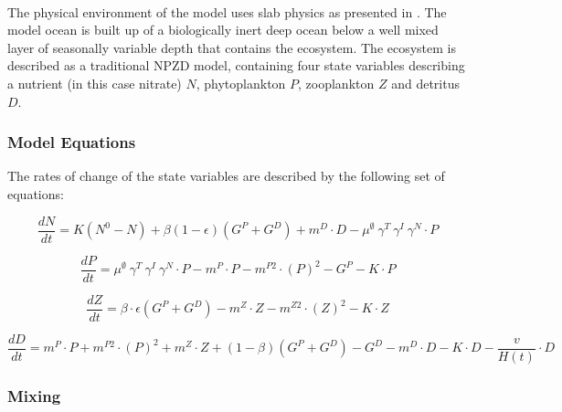\documentclass[template.tex]{subfiles}
\begin{document}
\\ 
The physical environment of the model uses slab physics as presented in \citet{Evans1985ACycles}. The model ocean is built up of a biologically inert deep ocean below a well mixed layer of seasonally variable depth that contains the ecosystem. The ecosystem is described as a traditional NPZD model, containing four state variables describing a nutrient (in this case nitrate) $N$, phytoplankton $P$, zooplankton $Z$ and detritus $D$. 

\subsubsection{Model Equations}
The rates of change of the state variables are described by the following set of equations:

\begin{equation}
    \frac{d N}{d t} = 
    K (N^0 - N) %
    + \beta(1 - \epsilon)(G^P + G^D) %
    + m^D \cdot D %
    - \mu^{\emptyset} \ \gamma^{T} \ \gamma^{I} \ \gamma^{N} \cdot P %
\end{equation}

\begin{equation}
    \frac{d P}{d t} =
    \mu^{\emptyset} \ \gamma^{T} \ \gamma^{I} \ \gamma^{N} \cdot P  %
    - m^P \cdot P %
    - m^{P2} \cdot (P)^2 %
    - G^P %
    - K \cdot P %
\end{equation}

\begin{equation}
    \frac{d Z}{d t} =
    \beta \cdot \epsilon(G^P + G^D) %
    - m^Z \cdot Z %
    - m^{Z2} \cdot (Z)^2 %
    - K \cdot Z %
\end{equation}

\begin{equation}
    \frac{d D}{d t} = 
    m^P \cdot P %
    + m^{P2} \cdot (P)^2 %
    + m^Z \cdot Z %
    + (1 - \beta)(G^P + G^D) %
    - G^D %
    - m^D \cdot D %
    - K \cdot D %
    - \frac{v}{H(t)} \cdot D %
\end{equation}



\subsubsection{Mixing}
\end{document}
